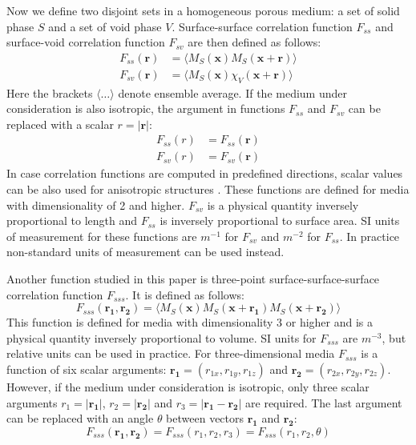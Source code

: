 \documentclass[preprint]{elsarticle}
\begin{document}
Now we define two disjoint sets in a homogeneous porous medium: a set of solid
phase $S$ and a set of void phase $V$. Surface-surface correlation function
$F_{ss}$ and surface-void correlation function $F_{sv}$ are then defined as
follows: \cite{Torquato_book}
\begin{align}
  F_{ss}(\bm{r}) &= \langle M_S(\bm{x}) M_S(\bm{x} + \bm{r}) \rangle \label{eq:fss} \\
  F_{sv}(\bm{r}) &= \langle M_S(\bm{x}) \chi_V(\bm{x} + \bm{r}) \rangle
  \label{eq:fsv}
\end{align}
Here the brackets $\langle \dots \rangle$ denote ensemble average. If the medium
under consideration is also isotropic, the argument in functions $F_{ss}$ and
$F_{sv}$ can be replaced with a scalar $r = |\bm{r}|$:
\begin{align}
  F_{ss}(r) &= F_{ss}(\bm{r}) \\
  F_{sv}(r) &= F_{sv}(\bm{r})
\end{align}
In case correlation functions are computed in predefined directions, scalar
values can be also used for anisotropic structures
\cite{jiao2014chawla,EPL1}. These functions are defined for media with
dimensionality of 2 and higher. $F_{sv}$ is a physical quantity inversely
proportional to length and $F_{ss}$ is inversely proportional to surface
area. SI units of measurement for these functions are $m^{-1}$ for $F_{sv}$
and $m^{-2}$ for $F_{ss}$. In practice non-standard units of measurement can be
used instead.

Another function studied in this paper is three-point surface-surface-surface
correlation function $F_{sss}$. It is defined as follows:
\begin{equation}
  F_{sss}(\bm{r_1}, \bm{r_2}) = \langle M_S(\bm{x}) M_S(\bm{x} + \bm{r_1})
  M_S(\bm{x} + \bm{r_2}) \rangle
  \label{eq:fsss}
\end{equation}
This function is defined for media with dimensionality 3 or higher and is a
physical quantity inversely proportional to volume. SI units for $F_{sss}$ are
$m^{-3}$, but relative units can be used in practice. For three-dimensional media
$F_{sss}$ is a function of six scalar arguments:
$\bm{r_1} = (r_{1x}, r_{1y}, r_{1z})$ and $\bm{r_2} = (r_{2x}, r_{2y}, r_{2z})$.
However, if the medium under consideration is isotropic, only three scalar
arguments $r_1 = |\bm{r_1}|$, $r_2 = |\bm{r_2}|$ and $r_3 = |\bm{r_1} - \bm{r_2}|$
are required. The last argument can be replaced with an angle $\theta$ between
vectors $\bm{r_1}$ and $\bm{r_2}$:
\begin{equation}
  F_{sss}(\bm{r_1}, \bm{r_2}) = F_{sss}(r_1, r_2, r_3) = F_{sss}(r_1, r_2, \theta)
\end{equation}
\end{document}
